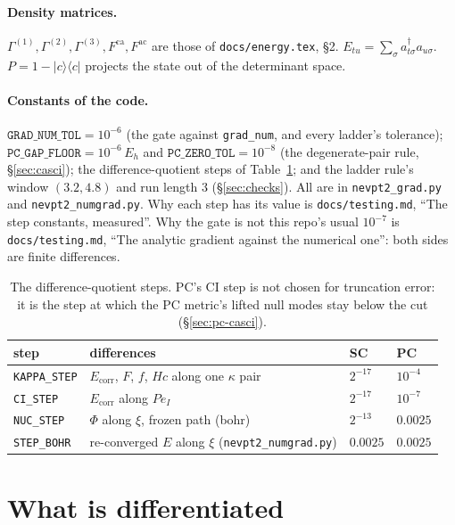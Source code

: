 \documentclass[11pt]{article}
\newcommand{\code}[1]{\texttt{#1}}
\newcommand{\G}[1]{\Gamma^{(#1)}}
\newcommand{\Fca}{F^{\mathrm{ca}}}
\newcommand{\Fac}{F^{\mathrm{ac}}}
\newcommand{\Ecorr}{E_{\mathrm{corr}}}
\begin{document}
\paragraph{Density matrices.} $\G1,\G2,\G3,\Fca,\Fac$ are those of
\code{docs/energy.tex}, \S2. $E_{tu} = \sum_\sigma a^\dagger_{t\sigma}
a_{u\sigma}$. $P = 1 - |c\rangle\langle c|$ projects the state out of the
determinant space.

\paragraph{Constants of the code.} $\code{GRAD\_NUM\_TOL} = 10^{-6}$ (the gate
against \code{grad\_num}, and every ladder's tolerance);
$\code{PC\_GAP\_FLOOR} = 10^{-6}\,E_h$ and $\code{PC\_ZERO\_TOL} = 10^{-8}$
(the degenerate-pair rule, \S\ref{sec:casci}); the difference-quotient steps
of Table~\ref{tab:steps}; and the ladder rule's window $(3.2, 4.8)$ and run
length $3$ (\S\ref{sec:checks}). All are in \code{nevpt2\_grad.py} and
\code{nevpt2\_numgrad.py}. Why each step has its value is
\code{docs/testing.md}, ``The step constants, measured''. Why the gate is not
this repo's usual $10^{-7}$ is \code{docs/testing.md}, ``The analytic gradient
against the numerical one'': both sides are finite differences.

\begin{table}[htbp]
\centering
\small
\begin{tabular}{@{}llll@{}}
\toprule
step & differences & SC & PC \\
\midrule
\code{KAPPA\_STEP} & $\Ecorr$, $F$, $f$, $Hc$ along one $\kappa$ pair & $2^{-17}$ & $10^{-4}$ \\
\code{CI\_STEP} & $\Ecorr$ along $Pe_I$ & $2^{-17}$ & $10^{-7}$ \\
\code{NUC\_STEP} & $\Phi$ along $\xi$, frozen path (bohr) & $2^{-13}$ & $0.0025$ \\
\code{STEP\_BOHR} & re-converged $E$ along $\xi$ (\code{nevpt2\_numgrad.py}) & $0.0025$ & $0.0025$ \\
\bottomrule
\end{tabular}
\caption{The difference-quotient steps. PC's CI step is not chosen for
truncation error: it is the step at which the PC metric's lifted null modes
stay below the cut (\S\ref{sec:pc-casci}).}
\label{tab:steps}
\end{table}

\section{What is differentiated}
\label{sec:functional}
\end{document}
